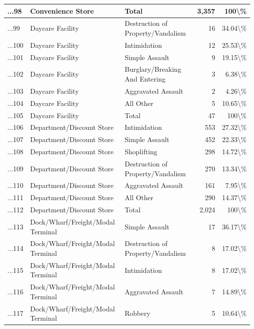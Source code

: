 \documentclass[
]{krantz}
\begin{document}
\begin{longtable}[t]{l|l|l|r|r}
\hline
...98 & Convenience Store & Total & 3,357 & 100\textbackslash{}\%\\
\hline
...99 & Daycare Facility & Destruction of Property/Vandalism & 16 & 34.04\textbackslash{}\%\\
\hline
...100 & Daycare Facility & Intimidation & 12 & 25.53\textbackslash{}\%\\
\hline
...101 & Daycare Facility & Simple Assault & 9 & 19.15\textbackslash{}\%\\
\hline
...102 & Daycare Facility & Burglary/Breaking And Entering & 3 & 6.38\textbackslash{}\%\\
\hline
...103 & Daycare Facility & Aggravated Assault & 2 & 4.26\textbackslash{}\%\\
\hline
...104 & Daycare Facility & All Other & 5 & 10.65\textbackslash{}\%\\
\hline
...105 & Daycare Facility & Total & 47 & 100\textbackslash{}\%\\
\hline
...106 & Department/Discount Store & Intimidation & 553 & 27.32\textbackslash{}\%\\
\hline
...107 & Department/Discount Store & Simple Assault & 452 & 22.33\textbackslash{}\%\\
\hline
...108 & Department/Discount Store & Shoplifting & 298 & 14.72\textbackslash{}\%\\
\hline
...109 & Department/Discount Store & Destruction of Property/Vandalism & 270 & 13.34\textbackslash{}\%\\
\hline
...110 & Department/Discount Store & Aggravated Assault & 161 & 7.95\textbackslash{}\%\\
\hline
...111 & Department/Discount Store & All Other & 290 & 14.37\textbackslash{}\%\\
\hline
...112 & Department/Discount Store & Total & 2,024 & 100\textbackslash{}\%\\
\hline
...113 & Dock/Wharf/Freight/Modal Terminal & Simple Assault & 17 & 36.17\textbackslash{}\%\\
\hline
...114 & Dock/Wharf/Freight/Modal Terminal & Destruction of Property/Vandalism & 8 & 17.02\textbackslash{}\%\\
\hline
...115 & Dock/Wharf/Freight/Modal Terminal & Intimidation & 8 & 17.02\textbackslash{}\%\\
\hline
...116 & Dock/Wharf/Freight/Modal Terminal & Aggravated Assault & 7 & 14.89\textbackslash{}\%\\
\hline
...117 & Dock/Wharf/Freight/Modal Terminal & Robbery & 5 & 10.64\textbackslash{}\%\\

\end{longtable}
\end{document}
